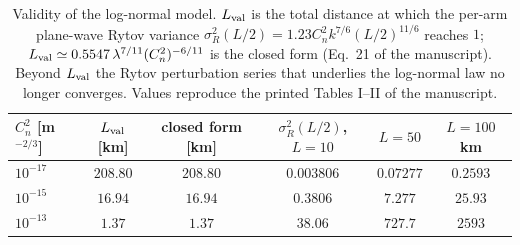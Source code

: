 \begin{table}[htbp]
\centering\small
\caption{Validity of the log-normal model. $L_{\rm val}$ is the total distance at which the per-arm plane-wave Rytov variance $\sigma_R^2(L/2)=1.23C_n^2k^{7/6}(L/2)^{11/6}$ reaches $1$; $L_{\rm val}\simeq0.5547\,\lambda^{7/11}(C_n^2)^{-6/11}$ is the closed form (Eq.~21 of the manuscript). Beyond $L_{\rm val}$ the Rytov perturbation series that underlies the log-normal law no longer converges. Values reproduce the printed Tables I--II of the manuscript.}
\label{tab:val}
\begin{tabular}{lccccc}
\toprule
$C_n^2$ [m$^{-2/3}$] & $L_{\rm val}$ [km] & closed form [km] & $\sigma_R^2(L/2)$, $L{=}10$ & $L{=}50$ & $L{=}100$ km\\
\midrule
$10^{-17}$ & $208.80$ & $208.80$ & $0.003806$ & $0.07277$ & $0.2593$ \\
$10^{-15}$ & $16.94$ & $16.94$ & $0.3806$ & $7.277$ & $25.93$ \\
$10^{-13}$ & $1.37$ & $1.37$ & $38.06$ & $727.7$ & $2593$ \\

\bottomrule
\end{tabular}
\end{table}


